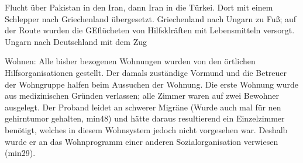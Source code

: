 Flucht über Pakistan in den Iran, dann Iran in die Türkei. Dort mit einem Schlepper nach Griechenland übergesetzt. Griechenland nach Ungarn zu Fuß; auf der Route wurden die GEflücheten von Hilfsklräften mit Lebensmitteln versorgt. Ungarn nach Deutschland mit dem Zug

Wohnen: Alle bisher bezogenen Wohnungen wurden von den örtlichen Hilfsorganisationen gestellt. Der damals zuständige Vormund und die Betreuer der Wohngruppe halfen beim Aussuchen der Wohnung.\newline
Die erste Wohnung wurde aus medizinischen Gründen verlassen; alle Zimmer waren auf zwei Bewohner ausgelegt. Der Proband leidet an schwerer Migräne (Wurde auch mal für nen gehirntumor gehalten, min48) und hätte daraus resultierend ein Einzelzimmer benötigt, welches in diesem Wohnsystem jedoch nicht vorgesehen war. Deshalb wurde er an das Wohnprogramm einer anderen Sozialorganisation verwiesen (min29).

